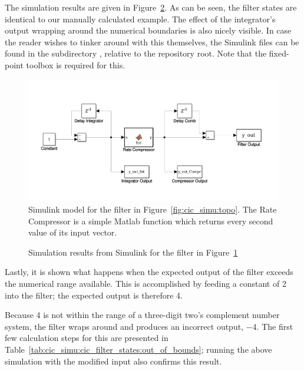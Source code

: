 The          simulation         results          are         given          in
Figure~\ref{fig:cic_simu:simulink_results}. As   can  be   seen,  the   filter
states  are  identical  to  our manually  calculated  example. The  effect  of
the  integrator's   output  wrapping   around  the  numerical   boundaries  is
also  nicely  visible. In  case  the  reader  wishes  to  tinker  around  with
this  themselves,  the  Simulink  files  can  be  found  in  the  subdirectory
, relative  to the repository  root. Note that
the fixed-point toolbox is required for this.

\begin{figure}
    \centering
    \includegraphics[width=\textwidth]{images/cicSimu/simulink.png}
    \caption[Simulink Filter Model]{%
        Simulink model  for the filter  in Figure~\ref{fig:cic_simu:topo}. The
        Rate   Compressor is  a  simple Matlab  function  which returns  every
        second value of its input vector.%
    }
    \label{fig:cic_simu:simulink_model}
\end{figure}

\begin{figure}
    \centering
    
    \caption[Simulink Simulation Results]{%
        Simulation    results    from    Simulink   for    the    filter    in
        Figure~\ref{fig:cic_simu:simulink_model}%
    }
    \label{fig:cic_simu:simulink_results}
\end{figure}

Lastly,  it is  shown what  happens  when the  expected output  of the  filter
exceeds  the numerical  range  available. This is  accomplished  by feeding  a
constant of \num{2} into the filter; the expected output is therefore \num{4}.

Because \num{4}  is not  within the  range of  a three-digit  two's complement
number  system, the  filter wraps  around  and produces  an incorrect  output,
\num{-4}.   The  first  few  calculation  steps  for  this  are  presented  in
Table~\ref{tab:cic_simu:cic_filter_states:out_of_bounds};  running  the  above
simulation with the modified input also confirms this result.

